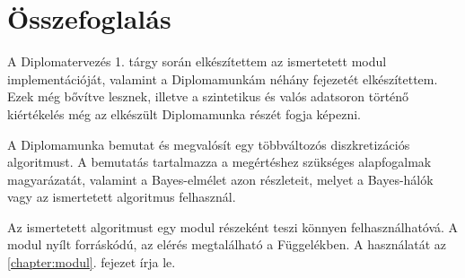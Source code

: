 \chapter{Összefoglalás}

A Diplomatervezés 1. tárgy során elkészítettem az ismertetett modul implementációját, valamint a Diplomamunkám néhány fejezetét elkészítettem. Ezek még bővítve lesznek, illetve a szintetikus és valós adatsoron történő kiértékelés még az elkészült Diplomamunka részét fogja képezni.

A Diplomamunka bemutat és megvalósít egy többváltozós diszkretizációs algoritmust. A bemutatás tartalmazza a megértéshez szükséges alapfogalmak magyarázatát, valamint a Bayes-elmélet azon részleteit, melyet a Bayes-hálók vagy az ismertetett algoritmus felhasznál.

Az ismertetett algoritmust egy modul részeként teszi könnyen felhasználhatóvá. A modul nyílt forráskódú, az elérés megtalálható a Függelékben. A használatát az \ref{chapter:modul}. fejezet írja le.

